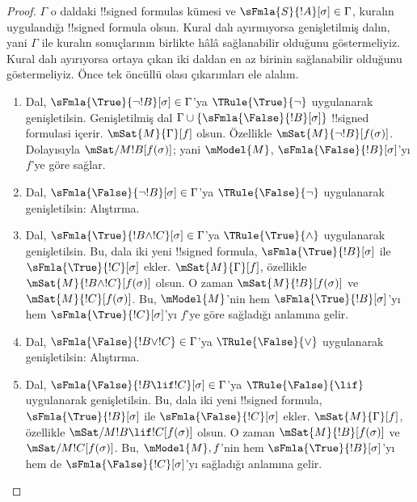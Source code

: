 \begin{proof}
$\Gamma$ o daldaki !!{signed formula}s kümesi ve
$\sFmla{S}{!A}[\sigma] \in \Gamma$, kuralın uygulandığı !!{signed formula}
olsun. Kural dalı ayırmıyorsa genişletilmiş dalın, yani $\Gamma$ ile kuralın
sonuçlarının birlikte hâlâ sağlanabilir olduğunu göstermeliyiz. Kural dalı
ayırıyorsa ortaya çıkan iki daldan en az birinin sağlanabilir olduğunu
göstermeliyiz.
Önce tek öncüllü olası çıkarımları ele alalım.
\begin{enumerate}
\item Dal, $\sFmla{\True}{\lnot !B}[\sigma] \in \Gamma$'ya
  $\TRule{\True}{\lnot}$ uygulanarak genişletilsin. Genişletilmiş dal
  $\Gamma \cup \{\sFmla{\False}{!B}[\sigma]\}$ !!{signed formula}s{}i
  içerir. $\mSat{M}{\Gamma}[f]$ olsun. Özellikle
  $\mSat{M}{\lnot !B}[f(\sigma)]$. Dolayısıyla
  $\mSat/{M}{!B}[f(\sigma)]$; yani $\mModel{M}$,
  $\sFmla{\False}{!B}[\sigma]$'yı $f$'ye göre sağlar.
\item Dal, $\sFmla{\False}{\lnot !B}[\sigma] \in \Gamma$'ya
  $\TRule{\False}{\lnot}$ uygulanarak genişletilsin: Alıştırma.
\item Dal, $\sFmla{\True}{!B \land !C}[\sigma] \in \Gamma$'ya
  $\TRule{\True}{\land}$ uygulanarak genişletilsin. Bu, dala iki yeni
  !!{signed formula}, $\sFmla{\True}{!B}[\sigma]$ ile
  $\sFmla{\True}{!C}[\sigma]$ ekler. $\mSat{M}{\Gamma}[f]$, özellikle
  $\mSat{M}{!B \land !C}[f(\sigma)]$ olsun. O zaman
  $\mSat{M}{!B}[f(\sigma)]$ ve $\mSat{M}{!C}[f(\sigma)]$. Bu,
  $\mModel{M}$'nin hem $\sFmla{\True}{!B}[\sigma]$'yı hem
  $\sFmla{\True}{!C}[\sigma]$'yı $f$'ye göre sağladığı anlamına gelir.
\item Dal, $\sFmla{\False}{!B \lor !C} \in \Gamma$'ya
  $\TRule{\False}{\lor}$ uygulanarak genişletilsin: Alıştırma.
\item Dal, $\sFmla{\False}{!B \lif !C}[\sigma] \in \Gamma$'ya
  $\TRule{\False}{\lif}$ uygulanarak genişletilsin. Bu, dala iki yeni
  !!{signed formula}, $\sFmla{\True}{!B}[\sigma]$ ile
  $\sFmla{\False}{!C}[\sigma]$ ekler. $\mSat{M}{\Gamma}[f]$, özellikle
  $\mSat/{M}{!B \lif !C}[f(\sigma)]$ olsun. O zaman
  $\mSat{M}{!B}[f(\sigma)]$ ve $\mSat/{M}{!C}[f(\sigma)]$. Bu,
  $\mModel{M},f$'nin hem $\sFmla{\True}{!B}[\sigma]$'yı hem de
  $\sFmla{\False}{!C}[\sigma]$'yı sağladığı anlamına gelir.

\end{enumerate}
\end{proof}
